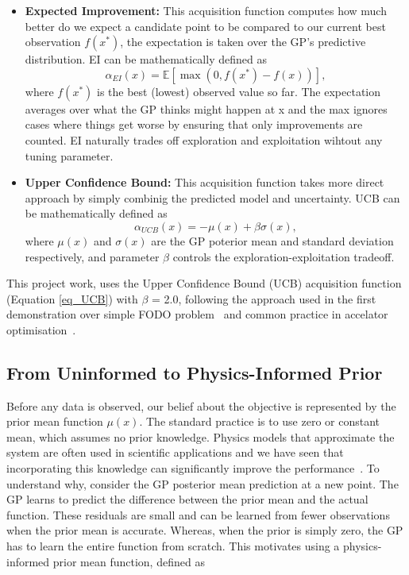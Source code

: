 \begin{itemize}
    \item  \textbf{Expected Improvement:} This acquisition function computes how much better do we expect a candidate point to be compared to our current best observation $f(x^*)$, the expectation is taken over the GP's predictive distribution. EI can be mathematically defined as
            \begin{equation}
                \alpha_{EI}(x) = \mathbb{E}[\max(0, f(x^*) - f(x))],
            \end{equation}
            where $f(x^*)$ is the best (lowest) observed value so far. The expectation averages over what the GP thinks might happen at x and the max ignores cases where things get worse by ensuring that only improvements are counted. EI naturally trades off exploration and exploitation wihtout any tuning parameter. 
    \item \textbf{Upper Confidence Bound:} This acquisition function takes more direct approach by simply combinig the predicted model and uncertainty.  UCB can be mathematically defined as
            \begin{equation}
                \label{eq_UCB}
                \alpha_{UCB}(x) = -\mu(x) + \beta \sigma(x),
            \end{equation}
            where $\mu(x)$ and $\sigma(x)$ are the GP poterior mean and standard deviation respectively, and parameter $\beta$ controls the exploration-exploitation tradeoff.  

\end{itemize}

This project work, uses the Upper Confidence Bound (UCB) acquisition function (Equation \ref{eq_UCB}) with $\beta$ = 2.0, 
following the approach used in the first demonstration over simple FODO problem~\cite{kaiser2024bridging} and common practice in accelator 
optimisation~\cite{roussel2024bo}. 


\subsection{From Uninformed to Physics-Informed Prior}

Before any data is observed, our belief about the objective is represented by the prior mean function $\mu(x)$. The standard practice is to use zero or constant mean, 
which assumes no prior knowledge. Physics models that approximate the system are often used in scientific applications and we have seen that incorporating this knowledge can significantly improve the performance~\cite{boltz2025priormeanmodule}. 
To understand why, consider the GP posterior mean prediction at a new point. The GP learns to predict the difference between the prior mean and the actual function. These residuals are small and can be 
learned from fewer observations when the prior mean is accurate. Whereas, when the prior is simply zero, the GP has to learn the entire function from scratch. This motivates using a physics-informed prior mean function, defined as

